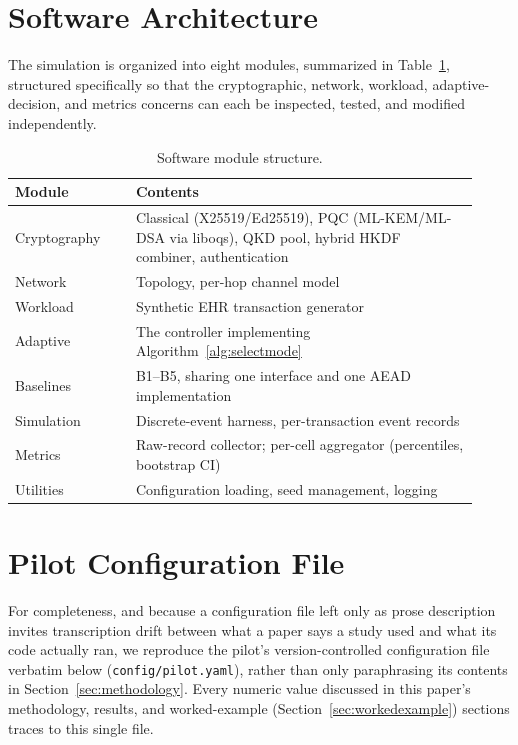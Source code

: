 \documentclass[journal]{IEEEtran}
\begin{document}
\section{Software Architecture}
\label{app:architecture}

The simulation is organized into eight modules, summarized in Table~\ref{tab:modules}, structured specifically so that the cryptographic, network, workload, adaptive-decision, and metrics concerns can each be inspected, tested, and modified independently.

\begin{table}[h]
\centering
\caption{Software module structure.}
\label{tab:modules}
\small
\begin{tabular}{@{}p{0.24\linewidth}p{0.68\linewidth}@{}}
\toprule
Module & Contents \\
\midrule
Cryptography & Classical (X25519/Ed25519), PQC (ML-KEM/ML-DSA via liboqs), QKD pool, hybrid HKDF combiner, authentication \\
Network & Topology, per-hop channel model \\
Workload & Synthetic EHR transaction generator \\
Adaptive & The controller implementing Algorithm~\ref{alg:selectmode} \\
Baselines & B1--B5, sharing one interface and one AEAD implementation \\
Simulation & Discrete-event harness, per-transaction event records \\
Metrics & Raw-record collector; per-cell aggregator (percentiles, bootstrap CI) \\
Utilities & Configuration loading, seed management, logging \\
\bottomrule
\end{tabular}
\end{table}

\section{Pilot Configuration File}
\label{app:config}

For completeness, and because a configuration file left only as prose description invites transcription drift between what a paper says a study used and what its code actually ran, we reproduce the pilot's version-controlled configuration file verbatim below (\texttt{config/pilot.yaml}), rather than only paraphrasing its contents in Section~\ref{sec:methodology}. Every numeric value discussed in this paper's methodology, results, and worked-example (Section~\ref{sec:workedexample}) sections traces to this single file.
\end{document}
